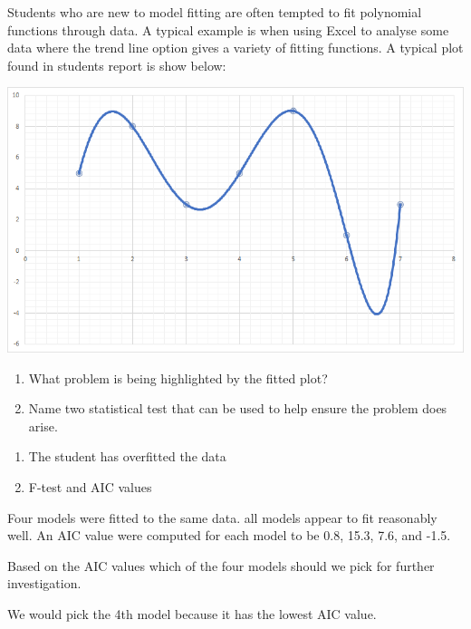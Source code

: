 \documentclass[12pt]{article}
\begin{document}
\begin{question}
Students who are new to model fitting are often tempted to fit polynomial functions through data. A typical example is when using Excel to analyse some data where the trend line option gives a variety of fitting functions. A typical plot found in students report is show below:
\begin{center}
\includegraphics[scale=0.5]{overfit.png}
\end{center}
\begin{enumerate}
\item What problem is being highlighted by the fitted plot?
\item Name two statistical test that can be used to help ensure the problem does arise.
\end{enumerate}
\end{question}
\begin{solution}
\begin{enumerate}
\item The student has overfitted the data
\item F-test and AIC values
\end{enumerate}
\end{solution}


\begin{question}
Four models were fitted to the same data. all models appear to fit reasonably well. An AIC value were computed for each model to be 0.8, 15.3, 7.6, and -1.5.

Based on the AIC values which of the four models should we pick for further investigation.
\end{question}
\begin{solution}
We would pick the 4th model because it has the lowest AIC value.
\end{solution}
\end{document}
